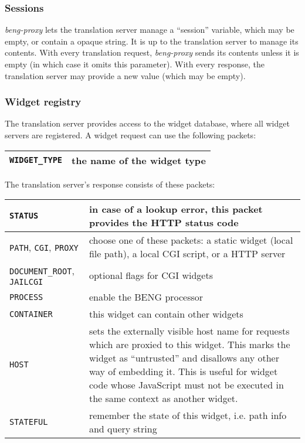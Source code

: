 \documentclass[a4paper,12pt]{article}
\begin{document}
\subsubsection{Sessions}
\label{sessions}

\emph{beng-proxy} lets the translation server manage a ``session''
variable, which may be empty, or contain a opaque string.  It is up to
the translation server to manage its contents.  With every translation
request, \emph{beng-proxy} sends its contents unless it is empty (in
which case it omits this parameter).  With every response, the
translation server may provide a new value (which may be empty).

\subsubsection{Widget registry}
\label{registry}

The translation server provides access to the widget database, where
all widget servers are registered.  A widget request can use the
following packets:

\begin{longtable}{|l|p{10cm}|}
\hline
\texttt{WIDGET\_TYPE} & the name of the widget type \\
\hline
\end{longtable}

The translation server's response consists of these packets:

\begin{longtable}{|l|p{8cm}|}
\hline
\texttt{STATUS} & in case of a lookup error, this packet provides the
HTTP status code \\
\hline

\texttt{PATH}, \texttt{CGI}, \texttt{PROXY} & choose one of these
packets: a static widget (local file path), a local CGI script, or a
HTTP server \\

\hline

\texttt{DOCUMENT\_ROOT}, \texttt{JAILCGI} & optional flags for CGI
widgets \\

\hline
\texttt{PROCESS} & enable the BENG processor \\
\hline
\texttt{CONTAINER} & this widget can contain other widgets \\

\hline

\texttt{HOST} & sets the externally visible host name for requests
which are proxied to this widget.  This marks the widget as
``untrusted'' and disallows any other way of embedding it.  This is
useful for widget code whose JavaScript must not be executed in the
same context as another widget. \\

\hline

\texttt{STATEFUL} & remember the state of this widget, i.e. path info
and query string \\

\hline
\end{longtable}
\end{document}
